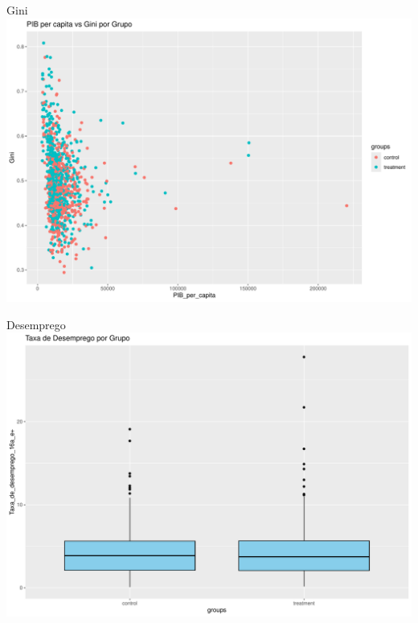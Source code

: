 \documentclass[
  ignorenonframetext,
]{beamer}
\begin{document}
\begin{frame}{Gini}
\label{gini}
\includegraphics{graficos_files/figure-beamer/unnamed-chunk-11-1.pdf}
\end{frame}

\begin{frame}{Desemprego}
\label{desemprego}
\includegraphics{graficos_files/figure-beamer/unnamed-chunk-12-1.pdf}
\end{frame}
\end{document}
